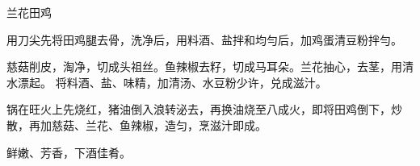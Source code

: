 \begin{recipe}{兰花田鸡}

\ingredients


\cooking

\step 用刀尖先将田鸡腿去骨，洗净后，用料酒、盐拌和均勻后，加鸡蛋清豆粉拌勻。

\step 慈菇削皮，淘净，切成头祖丝。鱼辣椒去籽，切成马耳朵。兰花抽心，去茎，用清水漂起。
将料酒、盐、味精，加清汤、水豆粉少许，兑成滋汁。 

\step 锅在旺火上先烧红，猪油倒入浪转泌去，再换油烧至八成火，即将田鸡倒下，炒散，再加慈菇、兰花、鱼辣椒，造匀，烹滋汁即成。

\notes

鲜嫩、芳香，下酒佳肴。

\end{recipe}

